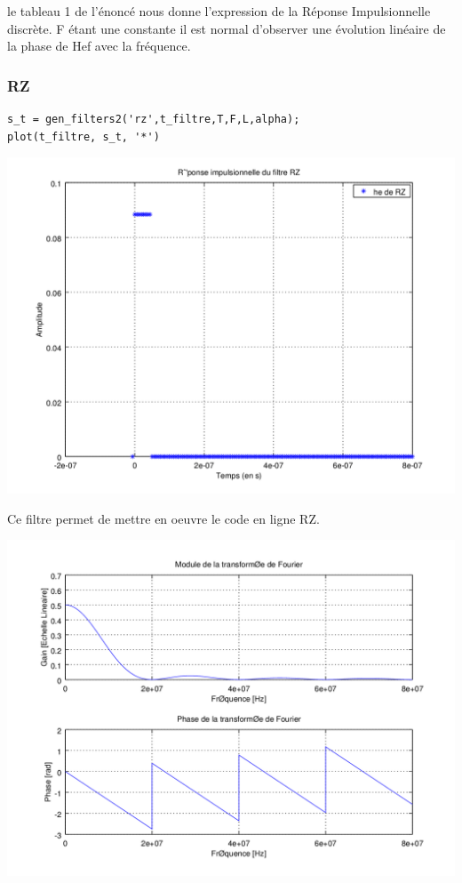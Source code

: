 \documentclass{acm_proc_article-sp}
\begin{document}
\begin{center}
le tableau 1 de l'énoncé nous donne l'expression de la Réponse Impulsionnelle discrète. F étant une constante il est normal d'observer une évolution linéaire de la phase de Hef avec la fréquence.

\subsubsection{RZ}

\begin{center}
\begin{lstlisting}
s_t = gen_filters2('rz',t_filtre,T,F,L,alpha);
plot(t_filtre, s_t, '*')
\end{lstlisting}

\includegraphics[scale=0.45]{RZ_3.png}


Ce filtre permet de mettre en oeuvre le code en ligne RZ.

\begin{center}
\includegraphics[scale=0.45]{RZ_rep_3.png}
\end{center}


\end{center}
\end{center}
\end{document}
